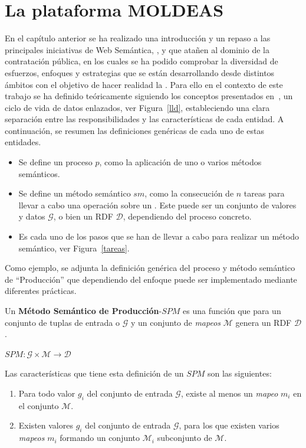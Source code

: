 \documentclass[a4paper,final,11pt,fleqn,twoside]{book}  %
\begin{document}
\chapter{La plataforma MOLDEAS}
En el capítulo anterior se ha realizado una introducción y un repaso a las principales iniciativas 
de Web Semántica, \opendata, \linkeddata y \lod que atañen al dominio de la contratación pública, en los cuales se ha podido comprobar
la diversidad de esfuerzos, enfoques y estrategias que se están desarrollando desde distintos ámbitos 
con el objetivo de hacer realidad la \wod. Para ello en el contexto de este trabajo se ha definido 
teóricamente siguiendo los conceptos presentados en~\cite{RDF,citeulike:1556975,RDFS,owl2-primer,SparqlSemantics}, 
un ciclo de vida de datos enlazados, ver Figura~\ref{lld}, estableciendo una clara separación entre las responsibilidades y 
las características de  cada entidad. A continuación, se resumen las definiciones genéricas de cada uno de estas entidades.
\begin{itemize}
 \item Se define un proceso $p$, como la aplicación de uno o varios métodos semánticos. 
 \item Se define un método semántico $sm$, como la consecución de $n$ tareas para llevar a cabo
una operación sobre un \dataset.  Este \dataset puede ser un conjunto de valores y datos $\mathcal{G}$, o bien
un \dataset RDF $\mathcal{D}$, dependiendo del proceso concreto.
\item  Es cada uno de los pasos que se han de llevar a cabo para realizar un método semántico, ver Figura~\ref{tareas}.
\end{itemize}
Como ejemplo, se adjunta la definición genérica del proceso y método semántico de ``Producción'' que dependiendo 
del enfoque puede ser implementado mediante diferentes prácticas.

Un \textbf{Método Semántico de Producción}-$SPM$ es una función que para un conjunto de tuplas de entrada o \dataset $\mathcal{G}$ y un conjunto de \textit{mapeos} $\mathcal{M}$  
genera un \dataset RDF $\mathcal{D}$.

\begin{center}
    $SPM : \mathcal{G} \times \mathcal{M} \longrightarrow \mathcal{D}$
\end{center}

Las características que tiene esta definición de un $SPM$ son las siguientes:
\begin{enumerate}
 \item Para todo valor $g_{i}$ del conjunto de entrada $\mathcal{G}$, existe al menos un \textit{mapeo} $m_{i}$ en el conjunto $\mathcal{M}$.
 \item Existen valores $g_{i}$ del conjunto de entrada $\mathcal{G}$, para los que existen varios \textit{mapeos} $m_{i}$ 
formando un conjunto $\mathcal{M}_{i}$ subconjunto de $\mathcal{M}$.
\end{enumerate}
\end{document}
